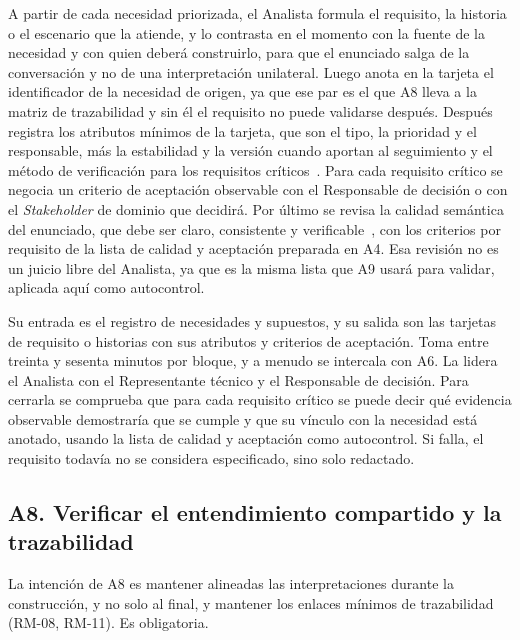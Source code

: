 \documentclass[12pt,letterpaper,oneside]{report}
\begin{document}
A partir de cada necesidad priorizada, el Analista formula el requisito, la
historia o el escenario que la atiende, y lo contrasta en el momento con la
fuente de la necesidad y con quien deberá construirlo, para que el enunciado
salga de la conversación y no de una interpretación unilateral. Luego anota en la
tarjeta el identificador de la necesidad de origen, ya que ese par es el que A8
lleva a la matriz de trazabilidad y sin él el requisito no puede validarse
después. Después registra los atributos mínimos de la tarjeta, que son el tipo,
la prioridad y el responsable, más la estabilidad y la versión cuando aportan
al seguimiento y el método de verificación para los requisitos
críticos~\cite{iso29148}. Para cada requisito crítico se negocia un criterio de
aceptación observable con el Responsable de decisión o con el \textit{Stakeholder} de
dominio que decidirá. Por último se revisa la calidad semántica del enunciado,
que debe ser claro, consistente y verificable~\cite{behutiye2022quality}, con
los criterios por requisito de la lista de calidad y aceptación preparada en A4.
Esa revisión no es un juicio libre del Analista, ya que es la misma lista que A9
usará para validar, aplicada aquí como autocontrol.

Su entrada es el registro de necesidades y supuestos, y su salida son las
tarjetas de requisito o historias con sus atributos y criterios de aceptación.
Toma entre treinta y sesenta minutos por bloque, y a menudo se intercala con A6.
La lidera el Analista con el Representante técnico y el Responsable de decisión.
Para cerrarla se comprueba que para cada requisito crítico se puede decir qué
evidencia observable demostraría que se cumple y que su vínculo con la
necesidad está anotado, usando la lista de calidad y aceptación como
autocontrol. Si falla, el requisito todavía no se considera especificado, sino
solo redactado.

\subsection{A8. Verificar el entendimiento compartido y la trazabilidad}
La intención de A8 es mantener alineadas las interpretaciones durante la
construcción, y no solo al final, y mantener los enlaces mínimos de
trazabilidad (RM-08, RM-11). Es obligatoria.
\end{document}
